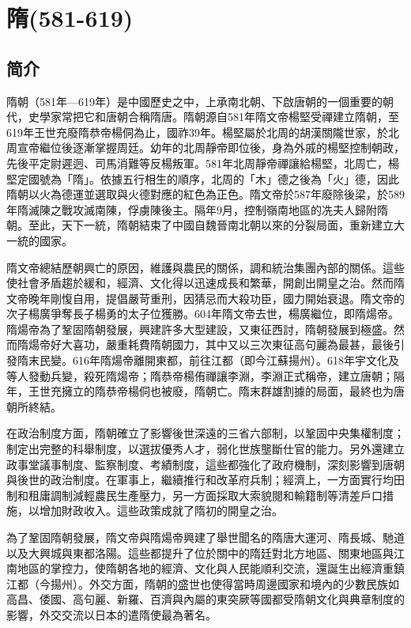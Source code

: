 
\chapter{隋\tiny(581-619)}

\section{简介}

隋朝（581年—619年）是中國歷史之中，上承南北朝、下啟唐朝的一個重要的朝代，史學家常把它和唐朝合稱隋唐。隋朝源自581年隋文帝楊堅受禪建立隋朝，至619年王世充廢隋恭帝楊侗為止，國祚39年。楊堅屬於北周的胡漢關隴世家，於北周宣帝繼位後逐漸掌握周廷。幼年的北周靜帝即位後，身為外戚的楊堅控制朝政，先後平定尉遲迥、司馬消難等反楊叛軍。581年北周靜帝禪讓給楊堅，北周亡，楊堅定國號為「隋」。依據五行相生的順序，北周的「木」德之後為「火」德，因此隋朝以火為德運並選取與火德對應的紅色為正色。隋文帝於587年廢除後梁，於589年隋滅陳之戰攻滅南陳，俘虜陳後主。隔年9月，控制嶺南地區的冼夫人歸附隋朝。至此，天下一統，隋朝結束了中國自魏晉南北朝以來的分裂局面，重新建立大一統的國家。

隋文帝總結歷朝興亡的原因，維護與農民的關係，調和統治集團內部的關係。這些使社會矛盾趨於緩和，經濟、文化得以迅速成長和繁華，開創出開皇之治。然而隋文帝晚年剛愎自用，提倡嚴苛重刑，因猜忌而大殺功臣，國力開始衰退。隋文帝的次子楊廣爭奪長子楊勇的太子位獲勝。604年隋文帝去世，楊廣繼位，即隋煬帝。隋煬帝為了鞏固隋朝發展，興建許多大型建設，又東征西討，隋朝發展到極盛。然而隋煬帝好大喜功，嚴重耗費隋朝國力，其中又以三次東征高句麗為最甚，最後引發隋末民變。616年隋煬帝離開東都，前往江都（即今江蘇揚州）。618年宇文化及等人發動兵變，殺死隋煬帝；隋恭帝楊侑禪讓李淵，李淵正式稱帝，建立唐朝；隔年，王世充擁立的隋恭帝楊侗也被廢，隋朝亡。隋末群雄割據的局面，最終也为唐朝所終結。

在政治制度方面，隋朝確立了影響後世深遠的三省六部制，以鞏固中央集權制度；制定出完整的科舉制度，以選拔優秀人才，弱化世族壟斷仕官的能力。另外還建立政事堂議事制度、監察制度、考績制度，這些都強化了政府機制，深刻影響到唐朝與後世的政治制度。在軍事上，繼續推行和改革府兵制；經濟上，一方面實行均田制和租庸調制減輕農民生產壓力，另一方面採取大索貌閱和輸籍制等清差戶口措施，以增加財政收入。這些政策成就了隋初的開皇之治。

為了鞏固隋朝發展，隋文帝與隋煬帝興建了舉世聞名的隋唐大運河、隋長城、馳道以及大興城與東都洛陽。這些都提升了位於關中的隋廷對北方地區、關東地區與江南地區的掌控力，使隋朝各地的經濟、文化與人民能順利交流，還誕生出經濟重鎮江都（今揚州）。外交方面，隋朝的盛世也使得當時周邊國家和境內的少數民族如高昌、倭國、高句麗、新羅、百濟與內屬的東突厥等國都受隋朝文化與典章制度的影響，外交交流以日本的遣隋使最為著名。

